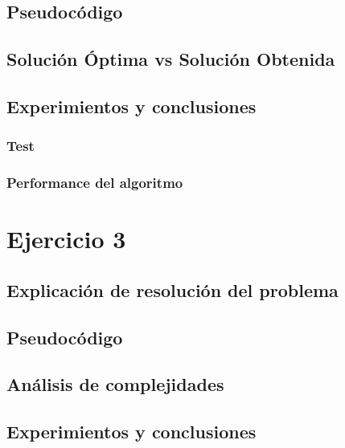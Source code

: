 \documentclass[12pt, a4paper]{article}
\begin{document}
\subsection{Pseudoc\'odigo}

%
\subsection{Soluci\'on \'Optima vs Soluci\'on Obtenida}

\subsection{Experimientos y conclusiones}
\subsubsection[2.5]{Test}
%
\subsubsection[2.5]{Performance del algoritmo}
%

\newpage
\section{Ejercicio 3} 
\subsection{Explicaci\'on de resoluci\'on del problema}

\subsection{Pseudoc\'odigo}

\subsection{An\'alisis de complejidades}

%
\subsection{Experimientos y conclusiones}
\end{document}
